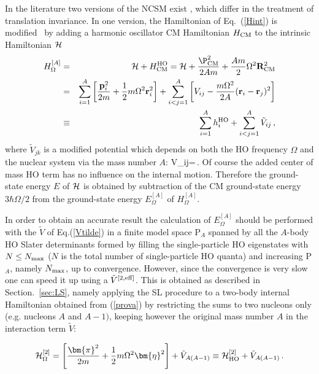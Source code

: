 In the literature two versions of the NCSM exist , which differ in the treatment of translation invariance.
In one version, the Hamiltonian of Eq.~(\ref{Hint})
is modified~\cite{ShF74} by adding a harmonic oscillator CM Hamiltonian $H_{\rm CM}$ to the intrinsic Hamiltonian $\cal H$
 \begin{eqnarray}
H^{[A]}_\Omega &=& {\cal H} + H_{\rm CM}^{\rm HO} = {\cal H} +  \frac {{\P}_{\rm \rm CM}^2} {2Am} + 
{\frac{Am}{2}} \Omega^2 {\bf R}_{\rm CM}^2 \\
\label{prova}
 &=& \sum_{i=1}^A \left[ {\frac{{\bf p}_i^2}{2m}}
+\frac{1}{2}m\Omega^2 {\bf r}^2_i
\right] + \sum_{i<j=1}^A \left[ V_{ij}
-\frac{m\Omega^2}{2A}
({\bf r}_i-{\bf r}_j)^2 
\right]\\
&\equiv& \sum_{i=1}^A h_i^{\rm HO} + \sum_{i<j=1}^A\tilde V_{ij} \,,
\label{HOmega}
\end{eqnarray}
where $\tilde V_{jk}$ is a modified potential which depends  on  both the HO frequency $\Omega$ and the nuclear 
system via the mass number $A$: 
\be
\label{Vtilde}
\tilde V_{ij}=\,.
\ee
Of course the added center of mass HO term has no influence on the internal motion. 
Therefore the ground-state energy $E$ of ${\cal H}$ is obtained
by subtraction of the CM ground-state energy $3\hbar \Omega/2$ from the ground-state energy 
$E^{[A]}_\Omega$ of $H^{[A]}_\Omega$. 

In order to obtain an accurate result the calculation of $E^{[A]}_\Omega$  should be  performed with the $\tilde V$ of Eq.(\ref{Vtilde})
in a finite model space  P${\!_A}$ spanned
by all the $A$-body HO Slater determinants formed by filling the single-particle HO eigenstates
with $N\leq N_{\rm max}$ ($N$ is the total number of single-particle HO quanta) and increasing  
P${\!_A}$, namely $N_{\rm max}$, up to convergence. However, since the convergence is very slow one can speed it up
using a $\tilde V^{\rm [2,eff]}$. This is obtained as described in Section.~\ref{sec:LS}, namely applying the SL procedure
to a two-body internal Hamiltonian obtained from (\ref{prova}) 
by restricting the sums to two nucleons only (e.g. nucleons $A$ and $A-1)$, keeping however the original mass number $A$ 
in the interaction term $\tilde V$:

\begin{equation}\label{HO2mega}
{\cal H}^{[2]}_\Omega = \left[ \frac{\bm {\pi}^2}{2 m}
+\frac{1}{2}m\Omega^2 \bm {\eta}^2\right ]+
\tilde V_{A(A-1)}
\equiv {\cal H}^{[2]}_{\rm HO} +\tilde V_{A(A-1)}  \,.
\end{equation}

